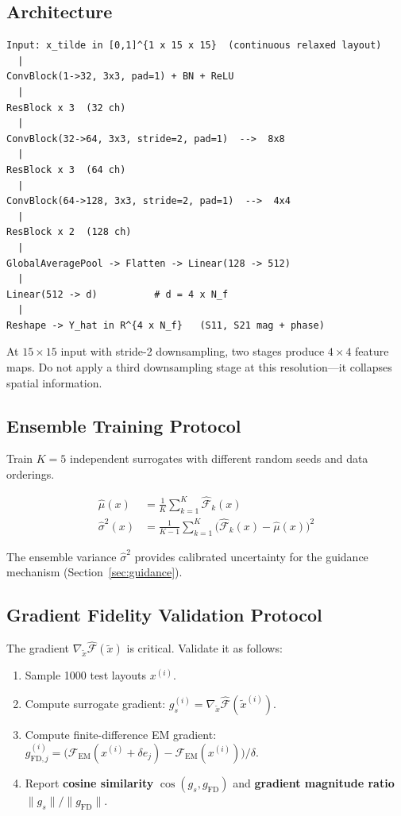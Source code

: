 \documentclass[12pt,a4paper]{article}
\newcommand{\FEM}{\mathcal{F}_{\mathrm{EM}}}
\newcommand{\xtilde}{\tilde{x}}
\newcommand{\NOTE}[1]{\begin{tcolorbox}[notebox]#1\end{tcolorbox}}
\theoremstyle{definition}
\theoremstyle{plain}
\theoremstyle{remark}
\begin{document}
\subsection{Architecture}

\begin{lstlisting}[caption={Physics-aware CNN surrogate.}]
Input: x_tilde in [0,1]^{1 x 15 x 15}  (continuous relaxed layout)
  |
ConvBlock(1->32, 3x3, pad=1) + BN + ReLU
  |
ResBlock x 3  (32 ch)
  |
ConvBlock(32->64, 3x3, stride=2, pad=1)  -->  8x8
  |
ResBlock x 3  (64 ch)
  |
ConvBlock(64->128, 3x3, stride=2, pad=1)  -->  4x4
  |
ResBlock x 2  (128 ch)
  |
GlobalAveragePool -> Flatten -> Linear(128 -> 512)
  |
Linear(512 -> d)          # d = 4 x N_f
  |
Reshape -> Y_hat in R^{4 x N_f}   (S11, S21 mag + phase)
\end{lstlisting}

\NOTE{At $15\times15$ input with stride-2 downsampling, two stages produce $4\times4$
feature maps.  Do not apply a third downsampling stage at this resolution—it collapses
spatial information.}

\subsection{Ensemble Training Protocol}

Train $K = 5$ independent surrogates with different random seeds and data orderings.

\begin{align}
  \hat{\mu}(x)    &= \frac{1}{K}\sum_{k=1}^K \hat{\mathcal{F}}_k(x)
  \label{eq:ensemble_mean}\\
  \hat{\sigma}^2(x) &= \frac{1}{K-1}\sum_{k=1}^K
                       \bigl(\hat{\mathcal{F}}_k(x) - \hat{\mu}(x)\bigr)^2
  \label{eq:ensemble_var}
\end{align}

The ensemble variance $\hat{\sigma}^2$ provides calibrated uncertainty for the
guidance mechanism (Section~\ref{sec:guidance}).

\subsection{Gradient Fidelity Validation Protocol}
\label{sec:grad_fidelity}

The gradient $\nabla_{\xtilde}\hat{\mathcal{F}}(\xtilde)$ is critical.
Validate it as follows:

\begin{enumerate}
  \item Sample 1000 test layouts $x^{(i)}$.
  \item Compute surrogate gradient:
        $g_s^{(i)} = \nabla_{\xtilde}\hat{\mathcal{F}}(\xtilde^{(i)})$.
  \item Compute finite-difference EM gradient:
        $g_{\mathrm{FD},j}^{(i)} =
          \bigl(\FEM(x^{(i)} + \delta e_j) - \FEM(x^{(i)})\bigr)/\delta$.
  \item Report \textbf{cosine similarity}
        $\cos(g_s, g_{\mathrm{FD}})$
        and \textbf{gradient magnitude ratio}
        $\|g_s\|/\|g_{\mathrm{FD}}\|$.
\end{enumerate}
\end{document}

